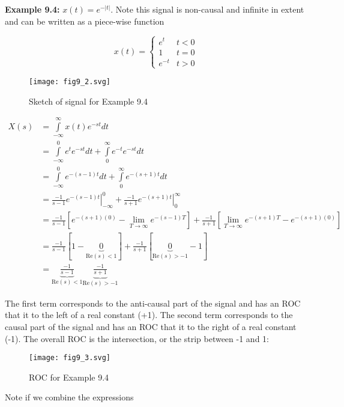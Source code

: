 \documentclass{article}
\begin{document}
\textbf{Example 9.4:} $x(t) = e^{-|t|}$. Note this signal is non-causal and infinite in extent and can be written as a piece-wise function

\[
x(t) = \left\{ \begin{array}{cc}
  e^t & t < 0\\
  1 & t = 0\\
  e^{-t} & t > 0
\end{array}
\right.
\]

\begin{figure}
  \centering
  \texttt{[image: fig9\_2.svg]}
  \caption{Sketch of signal for Example 9.4}
\end{figure}

\begin{align}
  X(s) &= \int\limits_{-\infty}^{\infty} x(t) e^{-st} dt\\
  &= \int\limits_{-\infty}^{0} e^{t} e^{-st} dt + \int\limits_{0}^{\infty} e^{-t} e^{-st} dt\\
  &= \int\limits_{-\infty}^{0} e^{-(s-1)t} dt + \int\limits_{0}^{\infty} e^{-(s+1)t} dt\\
  &= \left. \frac{-1}{s-1} e^{-(s-1)t} \right|_{-\infty}^{0} + \left. \frac{-1}{s+1} e^{-(s+1)t} \right|_{0}^{\infty}\\
  &= \frac{-1}{s-1} \left[e^{-(s+1)(0)} - \lim_{T\rightarrow \infty} e^{-(s-1)T} \right] + \frac{-1}{s+1} \left[\lim_{T\rightarrow \infty} e^{-(s+1)T} - e^{-(s+1)(0)} \right]\\
  &= \frac{-1}{s-1} \left[1 - \underbrace{0}_{\text{Re}(s) < 1} \right] + \frac{-1}{s+1} \left[\underbrace{0}_{\text{Re}(s) > -1} - 1 \right]\\
  &= \underbrace{\frac{-1}{s-1}}_{\text{Re}(s) < 1} \underbrace{\frac{-1}{s+1}}_{\text{Re}(s) > -1}
\end{align}

The first term corresponds to the anti-causal part of the signal and has an ROC that it to the left of a real constant (+1). The second term corresponds to the causal part of the signal and has an ROC that it to the right of a real constant (-1). The overall ROC is the intersection, or the strip between -1 and 1:

\begin{figure}
  \centering
  \texttt{[image: fig9\_3.svg]}
  \caption{ROC for Example 9.4}
\end{figure}

Note if we combine the expressions
\end{document}
